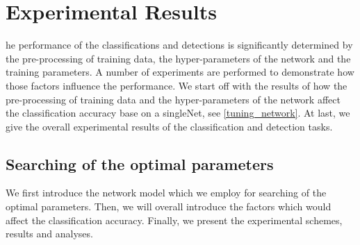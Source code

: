 %
%
\let\textcircled=\pgftextcircled
\chapter{Experimental Results}
\label{chap5}
he performance of the classifications and detections is significantly determined by the pre-processing of training data,  the hyper-parameters of the network and the training parameters. A number of experiments are performed to demonstrate how those factors influence the performance. We start off with the results of how the pre-processing of training data and the hyper-parameters of the network affect the classification accuracy base on a singleNet, see \ref{tuning_network}. At last, we give the overall experimental results of the classification and detection tasks.
  
\section{Searching of the optimal parameters}
We first introduce the network model which we employ for searching of the optimal parameters.  Then, we will overall introduce the factors which would affect the classification accuracy. Finally, we present the experimental schemes, results and analyses. 
